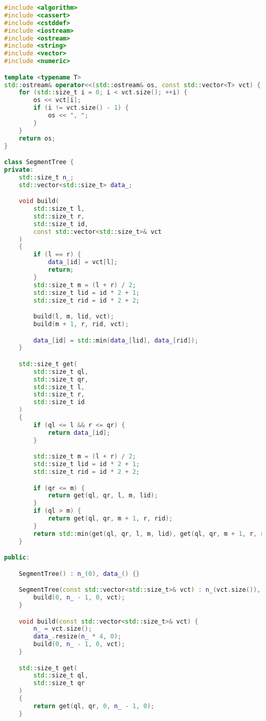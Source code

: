 \begin{lstlisting}[language=C++]
#include <algorithm>
#include <cassert>
#include <cstddef>
#include <iostream>
#include <ostream>
#include <string>
#include <vector>
#include <numeric>

template <typename T>
std::ostream& operator<<(std::ostream& os, const std::vector<T> vct) {
    for (std::size_t i = 0; i < vct.size(); ++i) {
        os << vct[i];
        if (i != vct.size() - 1) {
            os << ", ";
        }
    }
    return os;
}

class SegmentTree {
private:
    std::size_t n_;
    std::vector<std::size_t> data_;

    void build(
        std::size_t l,
        std::size_t r,
        std::size_t id,
        const std::vector<std::size_t>& vct
    )
    {
        if (l == r) {
            data_[id] = vct[l];
            return;
        }
        std::size_t m = (l + r) / 2;
        std::size_t lid = id * 2 + 1;
        std::size_t rid = id * 2 + 2;

        build(l, m, lid, vct);
        build(m + 1, r, rid, vct);

        data_[id] = std::min(data_[lid], data_[rid]);
    }

    std::size_t get(
        std::size_t ql,
        std::size_t qr,
        std::size_t l,
        std::size_t r,
        std::size_t id
    )
    {
        if (ql <= l && r <= qr) {
            return data_[id];
        }

        std::size_t m = (l + r) / 2;
        std::size_t lid = id * 2 + 1;
        std::size_t rid = id * 2 + 2;

        if (qr <= m) {
            return get(ql, qr, l, m, lid);
        }
        if (ql > m) {
            return get(ql, qr, m + 1, r, rid);
        }
        return std::min(get(ql, qr, l, m, lid), get(ql, qr, m + 1, r, rid));
    }

public:

    SegmentTree() : n_(0), data_() {}

    SegmentTree(const std::vector<std::size_t>& vct) : n_(vct.size()), data_(n_ * 4, 0) {
        build(0, n_ - 1, 0, vct);
    }

    void build(const std::vector<std::size_t>& vct) {
        n_ = vct.size();
        data_.resize(n_ * 4, 0);
        build(0, n_ - 1, 0, vct);
    }

    std::size_t get(
        std::size_t ql,
        std::size_t qr
    )
    {
        return get(ql, qr, 0, n_ - 1, 0);
    }


\end{lstlisting}
